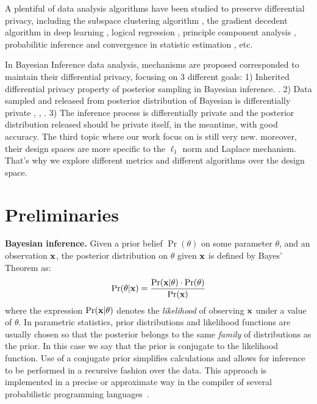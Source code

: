 \documentclass{article}
\begin{document}
A plentiful of data analysis algorithms have been studied to preserve differential privacy, including the subspace clustering algorithm \cite{wang2015differentially}, the gradient decedent algorithm in deep learning \cite{abadi2016deep}, logical regression \cite{chaudhuri2009privacy}, principle component analysis \cite{chaudhuri2012near}, probabilitic inference \cite{williams2010probabilistic} and convergence in statistic estimation \cite{chaudhuri2012convergence}, etc. 

In Bayesian Inference data analysis, mechanisms are proposed corresponded to maintain their differential privacy, focusing on 3 different goals: 1) Inherited differential privacy property of posterior sampling in Bayesian inference. \cite{dimitrakakis2014robust,zhang2016differential,zheng2015differential,wang2015privacy}. 2) Data sampled and released from posterior distribution of Bayesian is differentially private \cite{Zhang2017privbayes}, \cite{dimitrakakis2015differential},  \cite{foulds2016theory}. 3) The inference process is differentially private and the posterior distribution released should be private itself, in the meantime, with good accuracy. The third topic where our work focus on is still very new. moreover, their design spaces are more specific to the $\ell_1$ norm and Laplace mechanism. That's why we explore different metrics and different algorithms over the design space.


\section{Preliminaries}
\label{sec_background}
\noindent \textbf{Bayesian inference.} 
Given a prior belief $\Pr(\theta)$ on some parameter $\theta$,
and an observation $\textbf{x}$, the posterior distribution on $\theta$
given $\textbf{x}$ is defined by Bayes' Theorem as:
\[
  \Pr(\theta | \textbf{x}) = \frac{\Pr(\textbf{x} | \theta) \cdot \Pr(\theta)}{\Pr(\textbf{x})}
\]
where the expression $\Pr(\textbf{x} | \theta)$ denotes the
\emph{likelihood} of observing $\textbf{x}$ under a value of
$\theta$. 
In parametric statistics, prior distributions and likelihood functions are usually chosen so that the posterior
belongs to the same \emph{family} of distributions as the prior. In this case we say that the prior
is conjugate to the likelihood function. Use of a conjugate prior
simplifies calculations and allows for inference to be performed in a
recursive fashion over the data. This approach is implemented in a
precise or approximate way in the compiler of several
probabilistic programming languages~\cite{}.
\end{document}
